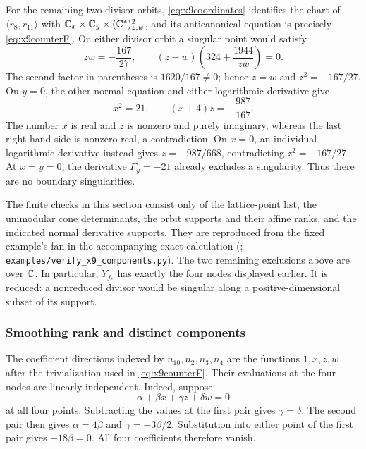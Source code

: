 For the remaining two divisor orbits, \eqref{eq:x9coordinates} identifies
the chart of $\langle r_8,r_{11}\rangle$ with
$\mathbb C_x\times\mathbb C_y\times(\mathbb C^*)^2_{z,w}$, and its anticanonical equation
is precisely \eqref{eq:x9counterF}. On either divisor orbit a singular
point would satisfy
\[
 zw=-\frac{167}{27},\qquad
 (z-w)\left(324+\frac{1944}{zw}\right)=0.
\]
The second factor in parentheses is $1620/167\ne0$; hence
$z=w$ and $z^2=-167/27$.
On $y=0$, the other normal equation and either logarithmic derivative give
\[
 x^2=21,\qquad (x+4)z=-\frac{987}{167}.
\]
The number $x$ is real and $z$ is nonzero and purely imaginary, whereas
the last right-hand side is nonzero real, a contradiction.
On $x=0$, an individual logarithmic derivative instead gives
$z=-987/668$, contradicting $z^2=-167/27$.
At $x=y=0$, the derivative $F_y=-21$ already excludes a singularity.
Thus there are no boundary singularities.

The finite checks in this section consist only of the lattice-point
list, the unimodular cone determinants, the orbit supports and their
affine ranks, and the indicated normal derivative supports. They are
reproduced from the fixed example's fan in the accompanying exact
calculation (\coderepo; \texttt{examples/verify\_x9\_components.py}). The two remaining exclusions above are over $\mathbb C$.
In particular, $Y_{f_*}$ has exactly the four nodes displayed earlier.
It is reduced: a nonreduced divisor would be singular along a
positive-dimensional subset of its support.

\subsubsection*{Smoothing rank and distinct components}

The coefficient directions indexed by $n_{10},n_2,n_3,n_4$ are the
functions $1,x,z,w$ after the trivialization used in
\eqref{eq:x9counterF}. Their evaluations at the four nodes are linearly
independent. Indeed, suppose
\[
 \alpha+\beta x+\gamma z+\delta w=0
\]
at all four points. Subtracting the values at the first pair gives
$\gamma=\delta$. The second pair then gives
$\alpha=4\beta$ and $\gamma=-3\beta/2$.
Substitution into either point of the first pair gives $-18\beta=0$.
All four coefficients therefore vanish.

